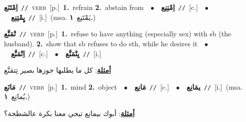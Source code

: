 \documentclass[10pt,a4paper,twoside]{article} %
\begin{document}
\begin{multicols}{2}
{\setlength\topsep{0pt}\textbf{\foreignlanguage{arabic}{اِمْتَنَع}}\ {\color{gray}\texttt{//}\color{black}}\ \textsc{verb}\ [p.]\ \textbf{1.}~refrain  \textbf{2.}~abstain from\ \ $\bullet$\ \ \setlength\topsep{0pt}\textbf{\foreignlanguage{arabic}{اِمْتِنِع}}\ {\color{gray}\texttt{//}\color{black}}\ [c.]\ \ $\bullet$\ \ \setlength\topsep{0pt}\textbf{\foreignlanguage{arabic}{يٍمْتِنِع}}\ {\color{gray}\texttt{//}\color{black}}\ [i.]\ \color{gray}(msa. \foreignlanguage{arabic}{يَمْتَنِع}~\foreignlanguage{arabic}{\textbf{١.}})\color{black}\ } \vspace{2mm}

{\setlength\topsep{0pt}\textbf{\foreignlanguage{arabic}{تْمَنَّع}}\ {\color{gray}\texttt{//}\color{black}}\ \textsc{verb}\ [p.]\ \textbf{1.}~refuse to have anything (especially sex) with sb (the husband).  \textbf{2.}~show that sb refuses to do sth, while he desires it\ \ $\bullet$\ \ \setlength\topsep{0pt}\textbf{\foreignlanguage{arabic}{اِتْمَنَّع}}\ {\color{gray}\texttt{//}\color{black}}\ [c.]\ \ $\bullet$\ \ \setlength\topsep{0pt}\textbf{\foreignlanguage{arabic}{يِتْمَنَّع}}\ {\color{gray}\texttt{//}\color{black}}\ [i.]\  \begin{flushright}\color{gray}\foreignlanguage{arabic}{\textbf{\underline{\foreignlanguage{arabic}{أمثلة}}}: كل ما يطلبها جوزها بصير تِتمَنَّع}\end{flushright}\color{black}} \vspace{2mm}

{\setlength\topsep{0pt}\textbf{\foreignlanguage{arabic}{مَانَع}}\ {\color{gray}\texttt{//}\color{black}}\ \textsc{verb}\ [p.]\ \textbf{1.}~mind  \textbf{2.}~object\ \ $\bullet$\ \ \setlength\topsep{0pt}\textbf{\foreignlanguage{arabic}{مَانِع}}\ {\color{gray}\texttt{//}\color{black}}\ [c.]\ \ $\bullet$\ \ \setlength\topsep{0pt}\textbf{\foreignlanguage{arabic}{يمَانِع}}\ {\color{gray}\texttt{//}\color{black}}\ [i.]\ \color{gray}(msa. \foreignlanguage{arabic}{يُمانِع}~\foreignlanguage{arabic}{\textbf{١.}})\color{black}\  \begin{flushright}\color{gray}\foreignlanguage{arabic}{\textbf{\underline{\foreignlanguage{arabic}{أمثلة}}}: أبوك بيمانِع تيجي معنا بكرة عالشطحة؟}\end{flushright}\color{black}} \vspace{2mm}


\end{multicols}
\end{document}
